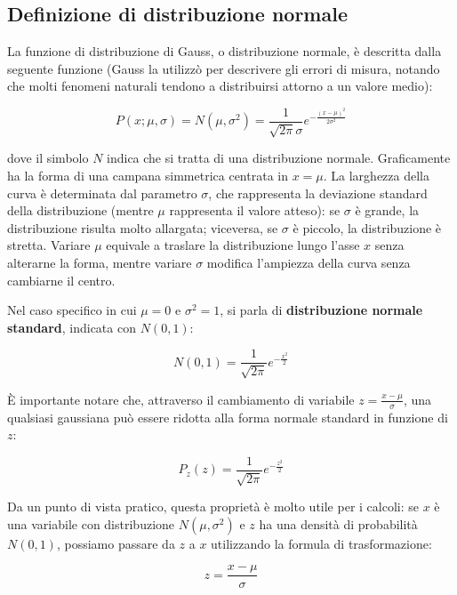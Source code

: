 \documentclass[openany,a4paper,12pt]{book}
\theoremstyle{remark}
\begin{document}
\subsection*{Definizione di distribuzione normale}

La funzione di distribuzione di Gauss, o distribuzione normale, è descritta dalla seguente funzione (Gauss la utilizzò per descrivere gli errori di misura, notando che molti fenomeni naturali tendono a distribuirsi attorno a un valore medio):

\begin{equation}
P(x; \mu , \sigma ) = N(\mu,\sigma^2) = \frac{1}{\sqrt{2\pi}\sigma}e^{-\frac{(x-\mu)^2}{2\sigma^2}}
\end{equation}

dove il simbolo $N$ indica che si tratta di una distribuzione normale.
Graficamente ha la forma di una campana simmetrica centrata in $x = \mu$. La larghezza della curva è determinata dal parametro $\sigma$, che rappresenta la deviazione standard della distribuzione (mentre $\mu$ rappresenta il valore atteso): se $\sigma$ è grande, la distribuzione risulta molto allargata; viceversa, se $\sigma$ è piccolo, la distribuzione è stretta.
Variare $\mu$ equivale a traslare la distribuzione lungo l'asse $x$ senza alterarne la forma, mentre variare $\sigma$ modifica l'ampiezza della curva senza cambiarne il centro.

Nel caso specifico in cui $\mu = 0$ e $\sigma^2 = 1$, si parla di \textbf{distribuzione normale standard}, indicata con $N(0,1)$:

\begin{equation}
N(0,1) = \frac{1}{\sqrt{2 \pi}} e^{-\frac{x^2}{2}}
\end{equation}

È importante notare che, attraverso il cambiamento di variabile $z = \frac{x-\mu}{\sigma}$, una qualsiasi gaussiana può essere ridotta alla forma normale standard in funzione di $z$:

\begin{equation}
P_z(z) = \frac{1}{\sqrt{2 \pi}} e^{-\frac{z^2}{2}}
\end{equation}

Da un punto di vista pratico, questa proprietà è molto utile per i calcoli: se $x$ è una variabile con distribuzione $N(\mu, \sigma^2)$ e $z$ ha una densità di probabilità $N(0,1)$, possiamo passare da $z$ a $x$ utilizzando la formula di trasformazione:

\begin{equation}
z = \frac{x-\mu}{\sigma}
\end{equation}
\end{document}
